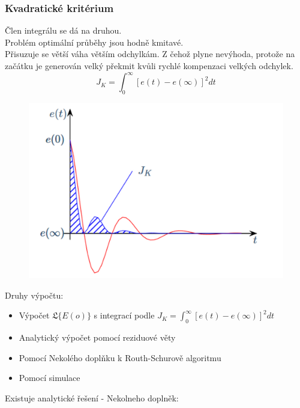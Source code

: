 \subsubsection*{Kvadratické kritérium}
Člen integrálu se dá na druhou.\\
Problém optimální průběhy jsou hodně kmitavé.\\
Přisuzuje se větší váha větším odchylkám. Z čehož plyne nevýhoda, protože na začátku je generován velký překmit kvůli rychlé kompenzaci velkých odchylek.\\
\begin{equation}
    J_K = \int^\infty_0[e(t) - e(\infty)]^2dt
\end{equation}
\begin{figure}[H]
    \includegraphics*[scale = 0.3]{images/kvadratickeKriterium.png}
\end{figure}
Druhy výpočtu:
\begin{itemize}
    \item Výpočet \(\mathfrak{L}\{E(o)\}\) s integrací podle \(J_K = \int^\infty_0[e(t) - e(\infty)]^2dt\)
    \item Analytický výpočet pomocí reziduové věty
    \item Pomocí Nekolého doplňku k Routh-Schurově algoritmu
    \item Pomocí simulace
\end{itemize}
Existuje analytické řešení - Nekolneho doplněk:
